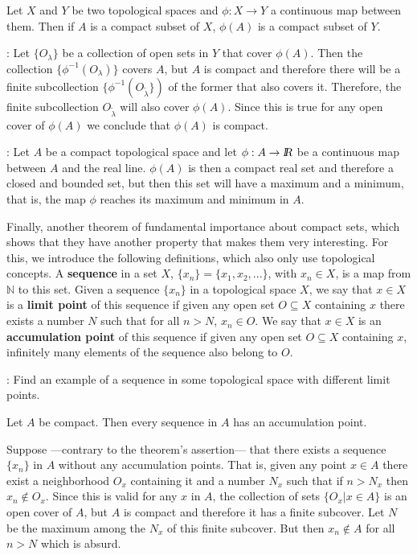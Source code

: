 \bteo
Let $X$ and $Y$ be two topological spaces and $\phi: X \to Y$ a continuous
map between them. Then if $A$ is a compact subset of $X$, 
$\phi(A)$ is a compact subset of $Y$.
\eteo

\pru:
Let $\{O_{\lambda}\}$ be a collection of open sets in $Y$ that cover $\phi(A)$.
Then the collection $\{\phi^{-1}(O_{\lambda})\}$ covers $A$, but $A$ is
compact and therefore there will be a finite subcollection 
$\{\phi^{-1}(O_{\tilde{\lambda}}\})$
of the former that also covers it. Therefore, the finite subcollection
$O_{\tilde{\lambda}}$ will also cover $\phi(A)$. Since this is
true for any open cover of $\phi(A)$
we conclude that $\phi(A)$ is compact.

\ejem: Let $A$ be a compact topological space and let $\phi:A \to \mbox{\sl {l$\!\!\!\;\:\!$R}}$ be a continuous map between $A$ and the real line. $\phi(A)$ is then a compact real set
and therefore a closed and bounded set, but
then this set will have a maximum and a minimum, that is, the
map $\phi$ reaches its maximum and minimum in $A$.


Finally, another theorem of fundamental importance about compact sets,
which shows that they have another property that makes them
very interesting. For this, we introduce the following definitions,
which also only use topological concepts.
A {\bf sequence} in a set $X$, 
$\{x_n\} = \{x_1, x_2, ...\}$, with $x_n \in X$, is a map
from $\mathbb{N}$ to this set.
Given a sequence $\{x_n\}$ in a topological space $X$, we say that 
$x \in X$ is a {\bf limit point} of this sequence if given
any open set $O \subseteq X$ containing $x$ there exists a number $N$
such that for all $n > N$, $x_n \in O$. We say that 
$x \in X$ is an {\bf accumulation point} of this sequence if given 
any open set $O \subseteq X$ containing $x$, infinitely many elements of the
sequence also belong to $O$. 

\espa

\ejer: Find an example of a sequence in some topological
space with different limit points. 

\espa

\bteo
Let $A$ be compact. Then every sequence in $A$ has an accumulation point.
\eteo

\espa

\bpru
Suppose ---contrary to the theorem's assertion--- that
there exists a sequence $\{x_n\}$ in $A$ without any accumulation points.
That is, given any point $x \in A$ there exist a neighborhood $O_x$
containing it and a number $N_x$ such that if $n > N_x$ then $x_n \notin
O_x$. Since this is valid for any $x$ in $A$, the collection of
sets $\{ O_x | x \in A \}$ is an open cover of $A$, but $A$ is compact and therefore
it has a finite subcover.
Let $N$ be the maximum among the $N_x$ of this finite subcover. But then
$x_n \notin A$ for all $n > N$ which is absurd.  
\epru

